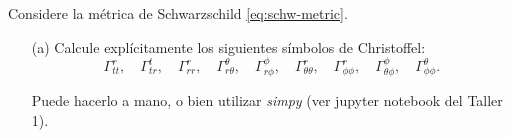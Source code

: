 
\question[2] 

Considere la métrica de Schwarzschild \eqref{eq:schw-metric}.

\begin{itemize}
\item[(a)] Calcule explícitamente los siguientes símbolos de Christoffel:
\[
\Gamma^r_{tt}, \quad \Gamma^t_{tr}, \quad \Gamma^r_{rr}, \quad \Gamma^\theta_{r\theta}, \quad \Gamma^\phi_{r\phi}, \quad \Gamma^r_{\theta\theta}, \quad \Gamma^r_{\phi\phi}, \quad \Gamma^\phi_{\theta\phi}, \quad \Gamma^\theta_{\phi\phi}.
\]

Puede hacerlo a mano, o bien utilizar \textit{simpy} (ver jupyter notebook del Taller 1).

\end{itemize}

\droptotalpoints

